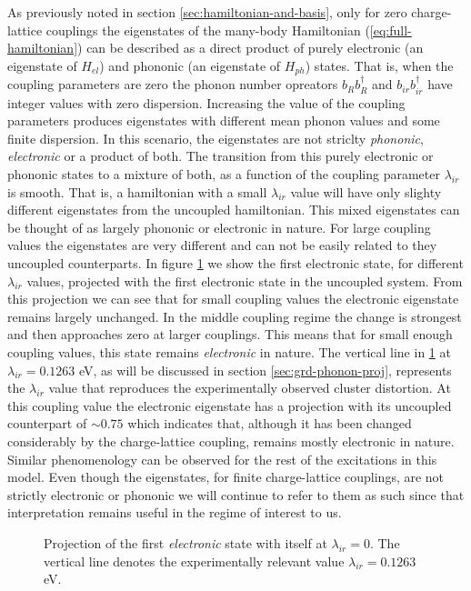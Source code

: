 As previously noted in section \ref{sec:hamiltonian-and-basis}, only for zero charge-lattice couplings the eigenstates of the many-body Hamiltonian (\ref{eq:full-hamiltonian}) can be described as a direct product of purely electronic (an eigenstate of $H_{el}$) and phononic (an eigenstate of $H_{ph}$) states. 
That is, when the coupling parameters are zero the phonon number opreators $b_Rb^\dagger_R$ and $b_{ir}b^\dagger_{ir}$ have integer values with zero dispersion.
Increasing the value of the coupling parameters produces eigenstates with different mean phonon values and some finite dispersion.
In this scenario, the eigenstates are not striclty \textit{phononic}, \textit{electronic} or a product of both. 
The transition from this purely electronic or phononic states to a mixture of both, as a function of the coupling parameter $\lambda_{ir}$ is smooth.
That is, a hamiltonian with a small $\lambda_{ir}$ value will have only slighty different eigenstates from the uncoupled hamiltonian.
This mixed eigenstates can be thought of as largely phononic or electronic in nature.
For large coupling values the eigenstates are very different and can not be easily related to they uncoupled counterparts.
In figure \ref{fig:electr-proj} we show the first electronic state, for different $\lambda_{ir}$ values, projected with the first electronic state in the uncoupled system.
From this projection we can see that for small coupling values the electronic eigenstate remains largely unchanged.
In the middle coupling regime the change is strongest and then approaches zero at larger couplings.
This means that for small enough coupling values, this state remains \textit{electronic} in nature.
The vertical line in \ref{fig:electr-proj} at $\lambda_{ir}=0.1263$ eV, as will be discussed in section \ref{sec:grd-phonon-proj}, represents the $\lambda_{ir}$ value that reproduces the experimentally observed cluster distortion.
At this coupling value the electronic eigenstate has a projection with its uncoupled counterpart of $\sim 0.75$ which indicates that, although it has been changed considerably by the charge-lattice coupling, remains mostly electronic in nature.
Similar phenomenology can be observed for the rest of the excitations in this model.
Even though the eigenstates, for finite charge-lattice couplings, are not strictly electronic or phononic we will continue to refer to them as such since that interpretation remains useful in the regime of interest to us.
%
\begin{figure}
  \centering
  
  \caption[Projection of the first \textit{electronic} state with itself at $\lambda_{ir}=0$.]
  {Projection of the first \textit{electronic} state with itself at $\lambda_{ir}=0$.
    The vertical line denotes the experimentally relevant value $\lambda_{ir}=0.1263$ eV.}
  \label{fig:electr-proj}
\end{figure}

